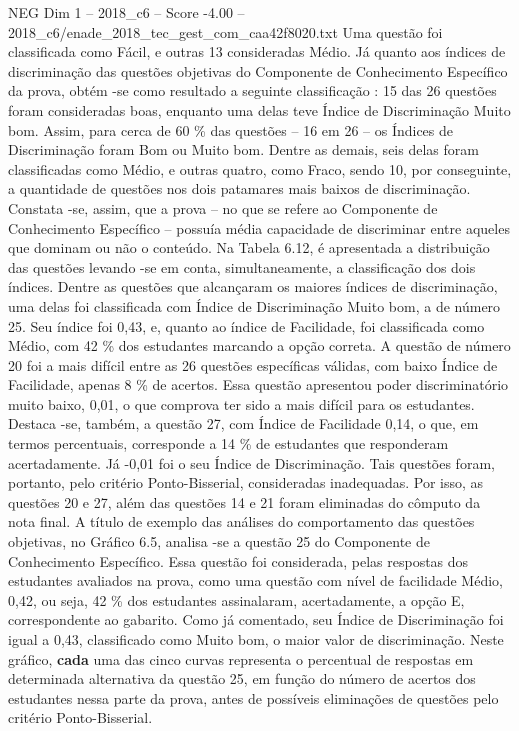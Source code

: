 \begin{textsample}{NEG Dim 1 – 2018\_c6 – Score -4.00 – 2018\_c6/enade\_2018\_tec\_gest\_com\_caa42f8020.txt}
Uma questão foi classificada como Fácil, e outras 13 consideradas Médio.
Já quanto aos índices de discriminação das questões objetivas do Componente de Conhecimento Específico da prova, obtém -se como resultado a seguinte classificação : 15 das 26 questões foram consideradas boas, enquanto uma delas teve Índice de Discriminação Muito bom.
Assim, para cerca de 60 \% das questões – 16 em 26 – os Índices de Discriminação foram Bom ou Muito bom.
Dentre as demais, seis delas foram classificadas como Médio, e outras quatro, como Fraco, sendo 10, por conseguinte, a quantidade de questões nos dois patamares mais baixos de discriminação.
Constata -se, assim, que a prova – no que se refere ao Componente de Conhecimento Específico – possuía média capacidade de discriminar entre aqueles que dominam ou não o conteúdo.
Na Tabela 6.12, é apresentada a distribuição das questões levando -se em conta, simultaneamente, a classificação dos dois índices.
Dentre as questões que alcançaram os maiores índices de discriminação, uma delas foi classificada com Índice de Discriminação Muito bom, a de número 25.
Seu índice foi 0,43, e, quanto ao índice de Facilidade, foi classificada como Médio, com 42 \% dos estudantes marcando a opção correta.
A questão de número 20 foi a mais difícil entre as 26 questões específicas válidas, com baixo Índice de Facilidade, apenas 8 \% de acertos.
Essa questão apresentou poder discriminatório muito baixo, 0,01, o que comprova ter sido a mais difícil para os estudantes.
Destaca -se, também, a questão 27, com Índice de Facilidade 0,14, o que, em termos percentuais, corresponde a 14 \% de estudantes que responderam acertadamente.
Já -0,01 foi o seu Índice de Discriminação.
Tais questões foram, portanto, pelo critério Ponto-Bisserial, consideradas inadequadas.
Por isso, as questões 20 e 27, além das questões 14 e 21 foram eliminadas do cômputo da nota final.
A título de exemplo das análises do comportamento das questões objetivas, no Gráfico 6.5, analisa -se a questão 25 do Componente de Conhecimento Específico.
Essa questão foi considerada, pelas respostas dos estudantes avaliados na prova, como uma questão com nível de facilidade Médio, 0,42, ou seja, 42 \% dos estudantes assinalaram, acertadamente, a opção E, correspondente ao gabarito.
Como já comentado, seu Índice de Discriminação foi igual a 0,43, classificado como Muito bom, o maior valor de discriminação.
Neste gráfico, \textbf{cada} uma das cinco curvas representa o percentual de respostas em determinada alternativa da questão 25, em função do número de acertos dos estudantes nessa parte da prova, antes de possíveis eliminações de questões pelo critério Ponto-Bisserial.

\end{textsample}
